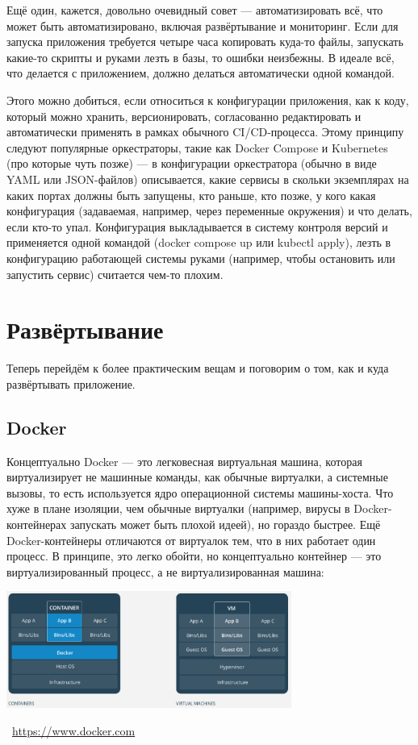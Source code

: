 \documentclass[a5paper]{article}
\newcommand{\attribution}[1] {
    \vspace{-5mm}\begin{flushright}\begin{scriptsize}\textcolor{gray}{\textcopyright\, #1}\end{scriptsize}\end{flushright}
}
\begin{document}
Ещё один, кажется, довольно очевидный совет --- автоматизировать всё, что может быть автоматизировано, включая развёртывание и мониторинг. Если для запуска приложения требуется четыре часа копировать куда-то файлы, запускать какие-то скрипты и руками лезть в базы, то ошибки неизбежны. В идеале всё, что делается с приложением, должно делаться автоматически одной командой.

Этого можно добиться, если относиться к конфигурации приложения, как к коду, который можно хранить, версионировать, согласованно редактировать и автоматически применять в рамках обычного CI/CD-процесса. Этому принципу следуют популярные оркестраторы, такие как Docker Compose и Kubernetes (про которые чуть позже) --- в конфигурации оркестратора (обычно в виде YAML или JSON-файлов) описывается, какие сервисы в скольки экземплярах на каких портах должны быть запущены, кто раньше, кто позже, у кого какая конфигурация (задаваемая, например, через переменные окружения) и что делать, если кто-то упал. Конфигурация выкладывается в систему контроля версий и применяется одной командой (docker compose up или kubectl apply), лезть в конфигурацию работающей системы руками (например, чтобы остановить или запустить сервис) считается чем-то плохим.

\section{Развёртывание}

Теперь перейдём к более практическим вещам и поговорим о том, как и куда развёртывать приложение.

\subsection{Docker}

Концептуально Docker --- это легковесная виртуальная машина, которая виртуализирует не машинные команды, как обычные виртуалки, а системные вызовы, то есть используется ядро операционной системы машины-хоста. Что хуже в плане изоляции, чем обычные виртуалки (например, вирусы в Docker-контейнерах запускать может быть плохой идеей), но гораздо быстрее. Ещё Docker-контейнеры отличаются от виртуалок тем, что в них работает один процесс. В принципе, это легко обойти, но концептуально контейнер --- это виртуализированный процесс, а не виртуализированная машина:

\begin{center}
    \includegraphics[width=0.7\textwidth]{docker.png}
    \attribution{\url{ https://www.docker.com}}
\end{center}
\end{document}
